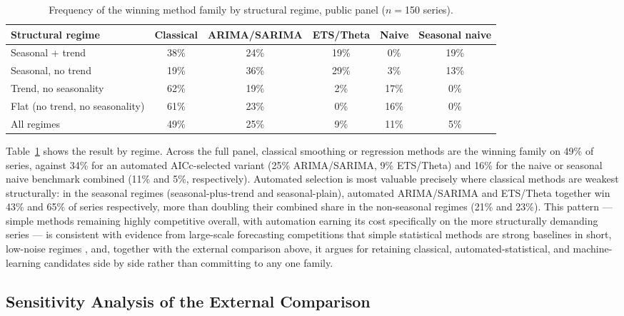 \documentclass[forecasting,article,submit,pdftex,moreauthors]{Definitions/mdpi}
\begin{document}
\begin{table}[H]
\caption{Frequency of the winning method family by structural regime, public panel ($n=$150 series).\label{tab:ganadores}}
\centering
\begin{tabularx}{\textwidth}{Xccccc}
\toprule
\textbf{Structural regime} & \textbf{Classical} & \textbf{ARIMA/SARIMA} & \textbf{ETS/Theta} & \textbf{Naive} & \textbf{Seasonal naive} \\
\midrule
Seasonal + trend & 38\% & 24\% & 19\% & 0\% & 19\% \\
Seasonal, no trend & 19\% & 36\% & 29\% & 3\% & 13\% \\
Trend, no seasonality & 62\% & 19\% & 2\% & 17\% & 0\% \\
Flat (no trend, no seasonality) & 61\% & 23\% & 0\% & 16\% & 0\% \\
\midrule
All regimes & 49\% & 25\% & 9\% & 11\% & 5\% \\
\bottomrule
\end{tabularx}
\end{table}

Table~\ref{tab:ganadores} shows the result by regime. Across the full panel, classical smoothing or regression methods are the winning family on 49\% of series, against 34\% for an automated AICc-selected variant (25\% ARIMA/SARIMA, 9\% ETS/Theta) and 16\% for the naive or seasonal naive benchmark combined (11\% and 5\%, respectively). Automated selection is most valuable precisely where classical methods are weakest structurally: in the seasonal regimes (seasonal-plus-trend and seasonal-plain), automated ARIMA/SARIMA and ETS/Theta together win 43\% and 65\% of series respectively, more than doubling their combined share in the non-seasonal regimes (21\% and 23\%). This pattern --- simple methods remaining highly competitive overall, with automation earning its cost specifically on the more structurally demanding series --- is consistent with evidence from large-scale forecasting competitions that simple statistical methods are strong baselines in short, low-noise regimes \cite{makridakis2020}, and, together with the external comparison above, it argues for retaining classical, automated-statistical, and machine-learning candidates side by side rather than committing to any one family.

\subsection{Sensitivity Analysis of the External Comparison}
\label{sec:sensitivity}
\end{document}
